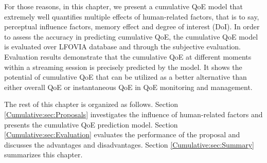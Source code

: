 For those reasons, in this chapter, we present a cumulative QoE model that extremely well quantifies multiple effects of human-related factors, that is to say, perceptual influence factors, memory effect and degree of interest (DoI).
In order to assess the accuracy in predicting cumulative QoE, the cumulative QoE model is evaluated over LFOVIA database \cite{LFOVIA} and through the subjective evaluation.
Evaluation results demonstrate that the cumulative QoE at different moments within a streaming session is precisely predicted by the model.
It shows the potential of cumulative QoE that can be utilized as a better alternative than either overall QoE or instantaneous QoE in QoE monitoring and management.

The rest of this chapter is organized as follows.
Section \ref{Cumulative:sec:Proposals} investigates the influence of human-related factors and presents the cumulative QoE prediction model.
 Section \ref{Cumulative:sec:Evaluation} evaluates the performance of the proposal and discusses the advantages and disadvantages.
 Section \ref{Cumulative:sec:Summary} summarizes this chapter.